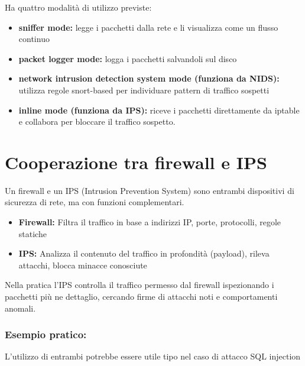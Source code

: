 \documentclass{report}
\begin{document}
\noindent Ha quattro modalità di utilizzo previste:
\begin{itemize}
    \item \textbf{sniffer mode:} legge i pacchetti dalla rete e li visualizza come un flusso continuo
    \item \textbf{packet logger mode:} logga i pacchetti salvandoli sul disco 
    \item \textbf{network intrusion detection system mode (funziona da NIDS):} utilizza regole snort-based per
individuare pattern di traffico sospetti
    \item \textbf{inline mode (funziona da IPS):} riceve i pacchetti direttamente da iptable e collabora per bloccare il
traffico sospetto.
\end{itemize}


\section{Cooperazione tra firewall e IPS}
Un firewall e un IPS (Intrusion Prevention System) sono entrambi dispositivi di sicurezza di rete, ma con funzioni complementari.
\begin{itemize}
    \item \textbf{Firewall:} Filtra il traffico in base a indirizzi IP, porte, protocolli, regole statiche
    \item \textbf{IPS:} Analizza il contenuto del traffico in profondità (payload), rileva attacchi, blocca minacce conosciute
\end{itemize}

\noindent Nella pratica l'IPS controlla il traffico permesso dal firewall ispezionando i pacchetti più ne dettaglio, cercando firme di attacchi noti e comportamenti anomali.

\subsubsection{Esempio pratico:}
L'utilizzo di entrambi potrebbe essere utile tipo nel caso di attacco SQL injection 
\end{document}
